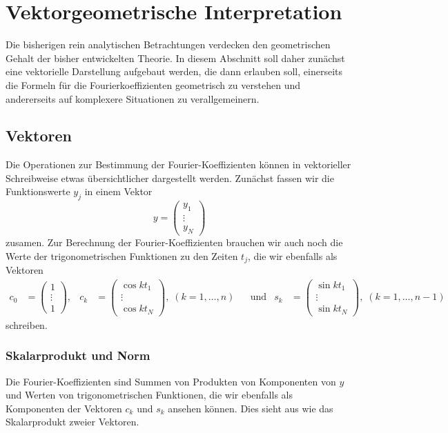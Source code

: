 %
%
%
\section{Vektorgeometrische Interpretation}
Die bisherigen rein analytischen Betrachtungen verdecken den geometrischen
Gehalt der bisher entwickelten Theorie.
In diesem Abschnitt soll daher zunächst eine vektorielle Darstellung
aufgebaut werden, die dann erlauben soll, einerseits die Formeln für die 
Fourierkoeffizienten geometrisch zu verstehen und andererseits auf
komplexere Situationen zu verallgemeinern.

\subsection{Vektoren}
Die Operationen zur Bestimmung der Fourier-Koeffizienten können in 
vektorieller Schreibweise etwas übersichtlicher dargestellt werden.
Zunächst fassen wir die Funktionswerte $y_j$ in einem Vektor
\begin{equation}
y = \begin{pmatrix}y_1\\\vdots\\y_N\end{pmatrix}
\end{equation}
zusamen.
Zur Berechnung der Fourier-Koeffizienten brauchen wir auch noch die
Werte der trigonometrischen Funktionen zu den Zeiten $t_j$, die wir
ebenfalls als Vektoren
\begin{align*}
c_0&=\begin{pmatrix}1\\\vdots\\1\end{pmatrix},
&
c_k&=\begin{pmatrix}\cos kt_1\\\vdots\\\cos kt_N\end{pmatrix},\;(k=1,\dots,n)
&&\text{und}
&
s_k&=\begin{pmatrix}\sin kt_1\\\vdots\\\sin kt_N\end{pmatrix},\;(k=1,\dots,n-1)
\end{align*}
schreiben.

\subsubsection{Skalarprodukt und Norm}
Die Fourier-Koeffizienten sind Summen von Produkten von Komponenten von $y$
und Werten von trigonometrischen Funktionen, die wir ebenfalls als Komponenten
der Vektoren $c_k$ und $s_k$ ansehen können.
Dies sieht aus wie das Skalarprodukt zweier Vektoren.

